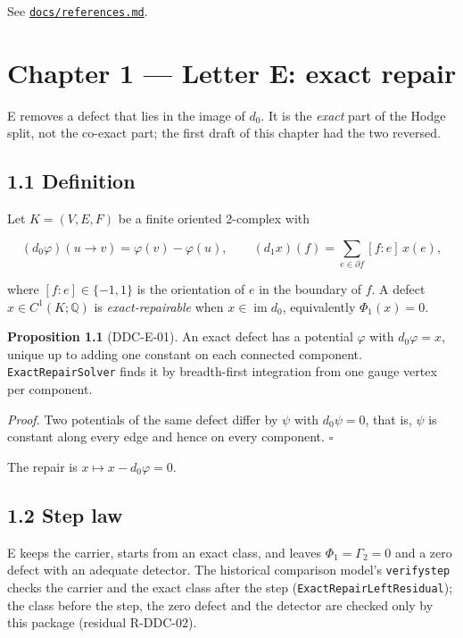 \documentclass[
  11pt,
]{article}
\renewcommand{\_}{\ddcunderscore\allowbreak}
\begin{document}
See \hyperref[references-and-their-role]{\texttt{docs/\allowbreak references.\allowbreak md}}.

\section{Chapter 1 --- Letter E: exact repair}\label{chapter-1}

E removes a defect that lies in the image of \(d_0\). It is the
\emph{exact} part of the Hodge split, not the co-exact part; the first
draft of this chapter had the two reversed.

\subsection{1.1 Definition}\label{definition-1}

Let \(K = (V, E, F)\) be a finite oriented 2-complex with

\[(d_0 \varphi)(u \to v) = \varphi(v) - \varphi(u), \qquad
(d_1 x)(f) = \sum_{e \in \partial f} [f : e]\, x(e),\]

where \([f : e] \in \{-1, 1\}\) is the orientation of \(e\) in the
boundary of \(f\). A defect \(x \in C^1(K; \mathbb{Q})\) is
\emph{exact-repairable} when \(x \in \operatorname{im} d_0\),
equivalently \(\Phi_1(x) = 0\).

\textbf{Proposition 1.1} (DDC-E-01). An exact defect has a potential
\(\varphi\) with \(d_0 \varphi = x\), unique up to adding one constant
on each connected component. \texttt{Exact\allowbreak Repair\allowbreak Solver} finds it by
breadth-first integration from one gauge vertex per component.

\emph{Proof.} Two potentials of the same defect differ by \(\psi\) with
\(d_0 \psi = 0\), that is, \(\psi\) is constant along every edge and
hence on every component. \(\square\)

The repair is \(x \mapsto x - d_0 \varphi = 0\).

\subsection{1.2 Step law}\label{step-law}

E keeps the carrier, starts from an exact class, and leaves
\(\Phi_1 = \Gamma_2 = 0\) and a zero defect with an adequate detector.
The historical comparison model's \texttt{verify\_step} checks the
carrier and the exact class after the step
(\texttt{Exact\allowbreak Repair\allowbreak Left\allowbreak Residual}); the class before the step, the zero
defect and the detector are checked only by this package (residual
R-DDC-02).
\end{document}
